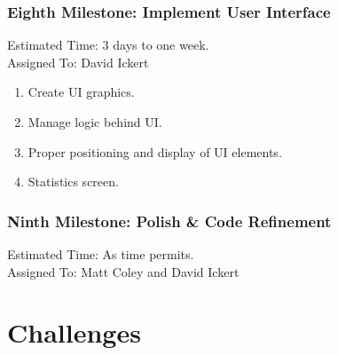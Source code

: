 \documentclass[]{article}
\newcommand*\bad{\item[\XSolidBrush]}
\begin{document}
		\subsubsection{Eighth Milestone: Implement User Interface}
		Estimated Time: 3 days to one week.\\
		Assigned To: David Ickert
		\begin{enumerate}
			\bad Create UI graphics.
			\bad Manage logic behind UI.
			\bad Proper positioning and display of UI elements.
			\bad Statistics screen.
		\end{enumerate}		
		\subsubsection{Ninth Milestone: Polish \& Code Refinement}
			Estimated Time: As time permits.\\
			Assigned To: Matt Coley and David Ickert		
	\section{Challenges}
\end{document}
